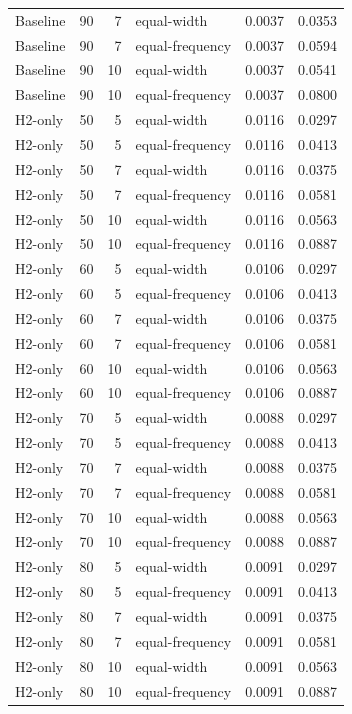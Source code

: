 \begin{tabular}{lrrlrr}
Baseline & 90 & 7 & equal-width & 0.0037 & 0.0353 \\
Baseline & 90 & 7 & equal-frequency & 0.0037 & 0.0594 \\
Baseline & 90 & 10 & equal-width & 0.0037 & 0.0541 \\
Baseline & 90 & 10 & equal-frequency & 0.0037 & 0.0800 \\
H2-only & 50 & 5 & equal-width & 0.0116 & 0.0297 \\
H2-only & 50 & 5 & equal-frequency & 0.0116 & 0.0413 \\
H2-only & 50 & 7 & equal-width & 0.0116 & 0.0375 \\
H2-only & 50 & 7 & equal-frequency & 0.0116 & 0.0581 \\
H2-only & 50 & 10 & equal-width & 0.0116 & 0.0563 \\
H2-only & 50 & 10 & equal-frequency & 0.0116 & 0.0887 \\
H2-only & 60 & 5 & equal-width & 0.0106 & 0.0297 \\
H2-only & 60 & 5 & equal-frequency & 0.0106 & 0.0413 \\
H2-only & 60 & 7 & equal-width & 0.0106 & 0.0375 \\
H2-only & 60 & 7 & equal-frequency & 0.0106 & 0.0581 \\
H2-only & 60 & 10 & equal-width & 0.0106 & 0.0563 \\
H2-only & 60 & 10 & equal-frequency & 0.0106 & 0.0887 \\
H2-only & 70 & 5 & equal-width & 0.0088 & 0.0297 \\
H2-only & 70 & 5 & equal-frequency & 0.0088 & 0.0413 \\
H2-only & 70 & 7 & equal-width & 0.0088 & 0.0375 \\
H2-only & 70 & 7 & equal-frequency & 0.0088 & 0.0581 \\
H2-only & 70 & 10 & equal-width & 0.0088 & 0.0563 \\
H2-only & 70 & 10 & equal-frequency & 0.0088 & 0.0887 \\
H2-only & 80 & 5 & equal-width & 0.0091 & 0.0297 \\
H2-only & 80 & 5 & equal-frequency & 0.0091 & 0.0413 \\
H2-only & 80 & 7 & equal-width & 0.0091 & 0.0375 \\
H2-only & 80 & 7 & equal-frequency & 0.0091 & 0.0581 \\
H2-only & 80 & 10 & equal-width & 0.0091 & 0.0563 \\
H2-only & 80 & 10 & equal-frequency & 0.0091 & 0.0887 \\

\end{tabular}
